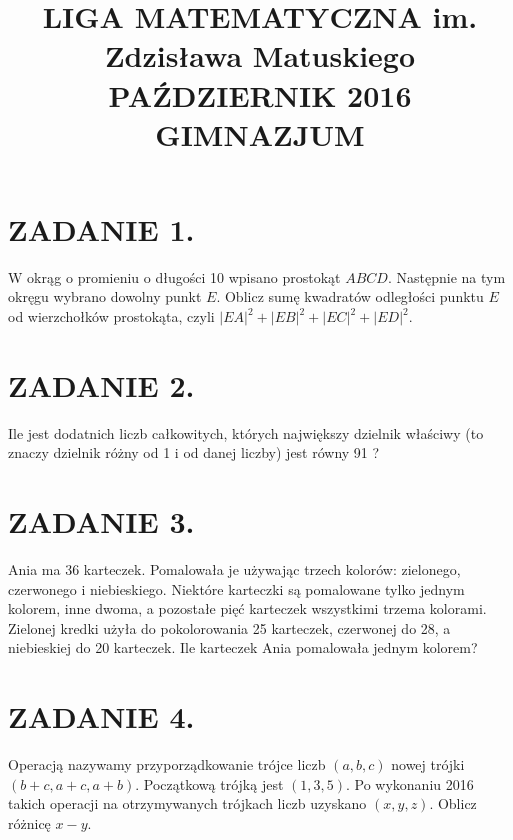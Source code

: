 \documentclass[10pt]{article}
\title{LIGA MATEMATYCZNA im. Zdzisława Matuskiego \\
 PAŹDZIERNIK 2016 \\
 GIMNAZJUM }
\author{}
\date{}
\begin{document}
\maketitle
\section*{ZADANIE 1.}
W okrąg o promieniu o długości 10 wpisano prostokąt \(A B C D\). Następnie na tym okręgu wybrano dowolny punkt \(E\). Oblicz sumę kwadratów odległości punktu \(E\) od wierzchołków prostokąta, czyli \(|E A|^{2}+|E B|^{2}+|E C|^{2}+|E D|^{2}\).

\section*{ZADANIE 2.}
Ile jest dodatnich liczb całkowitych, których największy dzielnik właściwy (to znaczy dzielnik różny od 1 i od danej liczby) jest równy 91 ?

\section*{ZADANIE 3.}
Ania ma 36 karteczek. Pomalowała je używając trzech kolorów: zielonego, czerwonego i niebieskiego. Niektóre karteczki są pomalowane tylko jednym kolorem, inne dwoma, a pozostałe pięć karteczek wszystkimi trzema kolorami. Zielonej kredki użyła do pokolorowania 25 karteczek, czerwonej do 28, a niebieskiej do 20 karteczek. Ile karteczek Ania pomalowała jednym kolorem?

\section*{ZADANIE 4.}
Operacją nazywamy przyporządkowanie trójce liczb \((a, b, c)\) nowej trójki \((b+c, a+c, a+b)\). Początkową trójką jest \((1,3,5)\). Po wykonaniu 2016 takich operacji na otrzymywanych trójkach liczb uzyskano \((x, y, z)\). Oblicz różnicę \(x-y\).
\end{document}
